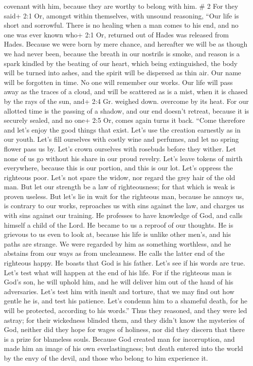 covenant with him, because they are worthy to belong with him. \# 2
 For they said+ 2:1 Or, amongst within themselves, with
unsound reasoning, ``Our life is short and sorrowful. There is no
healing when a man comes to his end, and no one was ever known who+ 2:1
Or, returned out of Hades was released from Hades.  Because
we were born by mere chance, and hereafter we will be as though we had
never been, because the breath in our nostrils is smoke, and reason is a
spark kindled by the beating of our heart,  which being
extinguished, the body will be turned into ashes, and the spirit will be
dispersed as thin air.  Our name will be forgotten in time.
No one will remember our works. Our life will pass away as the traces of
a cloud, and will be scattered as is a mist, when it is chased by the
rays of the sun, and+ 2:4 Gr. weighed down. overcome by its heat.
 For our allotted time is the passing of a shadow, and our
end doesn't retreat, because it is securely sealed, and no one+ 2:5 Or,
comes again turns it back.  ``Come therefore and let's enjoy
the good things that exist. Let's use the creation earnestly as in our
youth.  Let's fill ourselves with costly wine and perfumes,
and let no spring flower pass us by.  Let's crown ourselves
with rosebuds before they wither.  Let none of us go without
his share in our proud revelry. Let's leave tokens of mirth everywhere,
because this is our portion, and this is our lot.  Let's
oppress the righteous poor. Let's not spare the widow, nor regard the
grey hair of the old man.  But let our strength be a law of
righteousness; for that which is weak is proven useless. 
But let's lie in wait for the righteous man, because he annoys us, is
contrary to our works, reproaches us with sins against the law, and
charges us with sins against our training.  He professes to
have knowledge of God, and calls himself a child of the Lord.
 He became to us a reproof of our thoughts. 
He is grievous to us even to look at, because his life is unlike other
men's, and his paths are strange.  We were regarded by him
as something worthless, and he abstains from our ways as from
uncleanness. He calls the latter end of the righteous happy. He boasts
that God is his father.  Let's see if his words are true.
Let's test what will happen at the end of his life.  For if
the righteous man is God's son, he will uphold him, and he will deliver
him out of the hand of his adversaries.  Let's test him
with insult and torture, that we may find out how gentle he is, and test
his patience.  Let's condemn him to a shameful death, for
he will be protected, according to his words.''  Thus they
reasoned, and they were led astray; for their wickedness blinded them,
 and they didn't know the mysteries of God, neither did
they hope for wages of holiness, nor did they discern that there is a
prize for blameless souls.  Because God created man for
incorruption, and made him an image of his own everlastingness;
 but death entered into the world by the envy of the devil,
and those who belong to him experience it.

